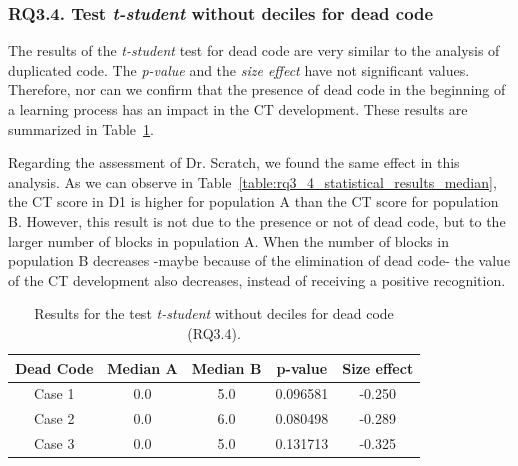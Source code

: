 \subsubsection{RQ3.4. Test \textit{t-student} without deciles for dead code}
\label{subsubsec:RQ3_4_statistical_results}

The results of the \textit{t-student} test for dead code are very similar to the analysis of duplicated code. The \textit{p-value} and the \textit{size effect} have not significant values. Therefore, nor can we confirm that the presence of dead code in the beginning of a learning process has an impact in the CT development. These results are summarized in Table~\ref{table:rq3_4_statistical_results}.

Regarding the assessment of Dr. Scratch, we found the same effect in this analysis. As we can observe in Table~\ref{table:rq3_4_statistical_results_median}, the CT score in D1 is higher for population A than the CT score for population B. However, this result is not due to the presence or not of dead code, but to the larger number of blocks in population A. When the number of blocks in population B decreases -maybe because of the elimination of dead code- the value of the CT development also decreases, instead of receiving a positive recognition.

\begin{table}
 \begin{center}
  \begin{tabular}{|c|c|c|c|c|}
    \hline
    \textbf{Dead Code} & \textbf{Median A} & \textbf{Median B} & \textbf{p-value} & \textbf{Size effect} \\ \hline
    Case 1 & 0.0 & 5.0 & 0.096581 & -0.250 \\ \hline
    Case 2 & 0.0 & 6.0 & 0.080498 & -0.289 \\ \hline
    Case 3 & 0.0 & 5.0 & 0.131713 & -0.325 \\ \hline
  \end{tabular}
  \caption{Results for the test \textit{t-student} without deciles for dead code (RQ3.4).}
  \label{table:rq3_4_statistical_results}
 \end{center}
\end{table}


